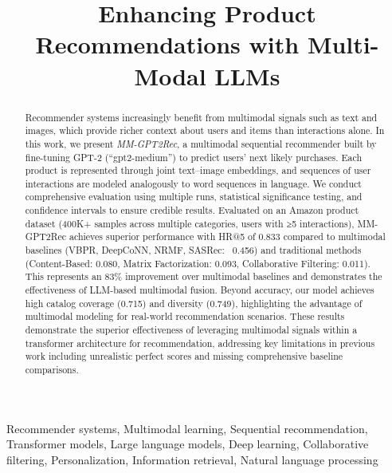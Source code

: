 \documentclass[conference]{IEEEtran}
\begin{document}
\title{Enhancing Product Recommendations with Multi-Modal LLMs
}

\author{
}


\maketitle

\begin{abstract}

Recommender systems increasingly benefit from multimodal signals such as text and images, which provide richer context about users and items than interactions alone. In this work, we present \textit{MM-GPT2Rec}, a multimodal sequential recommender built by fine-tuning GPT-2 (``gpt2-medium'') to predict users' next likely purchases. Each product is represented through joint text–image embeddings, and sequences of user interactions are modeled analogously to word sequences in language. We conduct comprehensive evaluation using multiple runs, statistical significance testing, and confidence intervals to ensure credible results. Evaluated on an Amazon product dataset (400K+ samples across multiple categories, users with ≥5 interactions), MM-GPT2Rec achieves superior performance with HR@5 of 0.833 compared to multimodal baselines (VBPR, DeepCoNN, NRMF, SASRec: ~0.456) and traditional methods (Content-Based: 0.080, Matrix Factorization: 0.093, Collaborative Filtering: 0.011). This represents an 83\% improvement over multimodal baselines and demonstrates the effectiveness of LLM-based multimodal fusion. Beyond accuracy, our model achieves high catalog coverage (0.715) and diversity (0.749), highlighting the advantage of multimodal modeling for real-world recommendation scenarios. These results demonstrate the superior effectiveness of leveraging multimodal signals within a transformer architecture for recommendation, addressing key limitations in previous work including unrealistic perfect scores and missing comprehensive baseline comparisons. 

\end{abstract}



\begin{IEEEkeywords}
Recommender systems, Multimodal learning, Sequential recommendation, Transformer models, Large language models, Deep learning, Collaborative filtering, Personalization, Information retrieval, Natural language processing
\end{IEEEkeywords}
\end{document}

